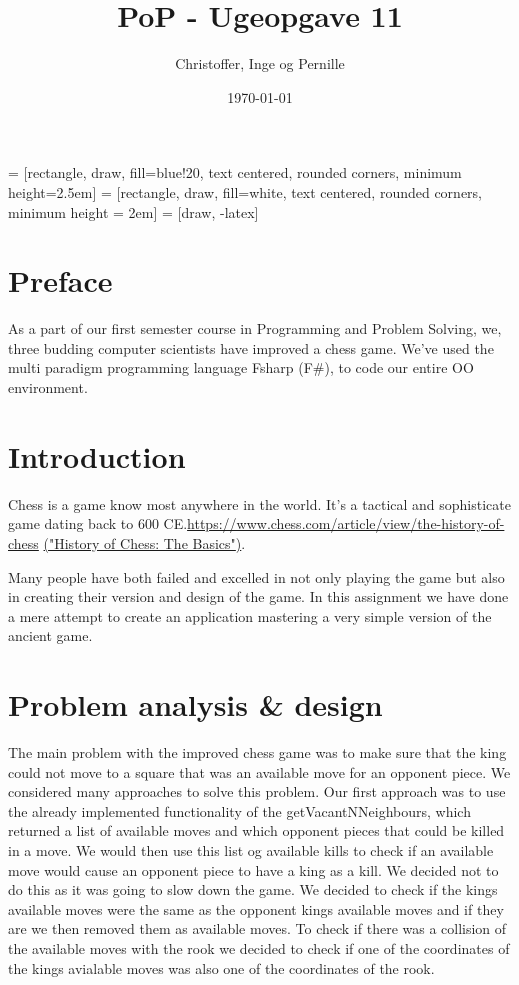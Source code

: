 \documentclass[a4paper]{report}
\title{PoP - Ugeopgave 11}
\author{Christoffer, Inge og Pernille}
\date{\today}
\begin{document}
\maketitle
{} = [rectangle, draw, fill=blue!20, text centered,
    rounded corners, minimum height=2.5em]
 = [rectangle, draw, fill=white, text centered,
    rounded corners, minimum height = 2em]
 = [draw, -latex]

\section*{Preface}
As a part of our first semester course in Programming and Problem Solving, we, three budding computer scientists have improved a chess game. We've used the multi paradigm programming language Fsharp (F\#), to code our entire OO environment.


\section*{Introduction}
Chess is a game know most anywhere in the world. It's a tactical and sophisticate game dating back to 600 CE.\url{https://www.chess.com/article/view/the-history-of-chess} \href{https://www.chess.com/article/view/the-history-of-chess}{(\textsf{"History of Chess: The Basics"})}.

Many people have both failed and excelled in not only playing the game but also in creating their version and design of the game.
In this assignment we have done a mere attempt to create an application mastering a very simple version of the ancient game.


\section*{Problem analysis \& design}
The main problem with the improved chess game was to make sure that the king could not move to a square that was an available move for an opponent piece. We considered many approaches to solve this problem.
Our first approach was to use the already implemented functionality of the getVacantNNeighbours, which returned a list of available moves and which opponent pieces that could be killed in a move. We
would then use this list og available kills to check if an available move would cause an opponent piece to have a king as a kill. We decided not to do this as it was going to slow down the game. We decided to
check if the kings available moves were the same as the opponent kings available moves and if they are we then removed them as available moves. To check if there was a collision of the available moves with the rook we
decided to check if one of the coordinates of the kings avialable moves was also one of the coordinates of the rook.
\end{document}
